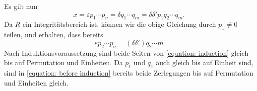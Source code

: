 Es gilt nun
\begin{equation}
  \label{equation: before induction}
    x
  = \varepsilon p_1 \dotsm p_n
  = \delta q_1 \dotsm q_m
  = \delta \delta' p_1 q_2 \dotsm q_m.
\end{equation}
Da $R$ ein Integritätsbereich ist, können wir die obige Gleichung durch $p_1 \neq 0$ teilen, und erhalten, dass bereits
\begin{equation}
  \label{equation: induction}
    \varepsilon p_2 \dotsm p_n
  = (\delta \delta') q_2 \dotsm m
\end{equation}
Nach Induktionsvoraussetzung sind beide Seiten von \eqref{equation: induction} gleich bis auf Permutation und Einheiten.
Da $p_1$ und $q_1$ auch gleich bis auf Einheit sind, sind in \eqref{equation: before induction} bereits beide Zerlegungen bis auf Permutation und Einheiten gleich.




